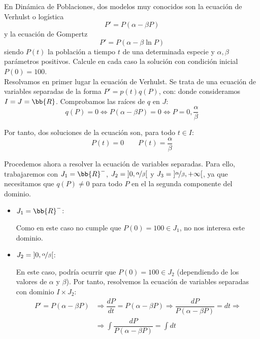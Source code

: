 \begin{ejercicio}
    En Dinámica de Poblaciones, dos modelos muy conocidos son la ecuación de Verhulst o logística
    \begin{equation*}
        P' = P(\alpha - \beta P)
    \end{equation*}
    y la ecuación de Gompertz
    \begin{equation*}
        P' = P(\alpha - \beta \ln P)
    \end{equation*}
    siendo $P(t)$ la población a tiempo $t$ de una determinada especie y $\alpha, \beta$ parámetros positivos. Calcule en cada caso la solución con condición inicial $P(0) = 100$.\\

    Resolvamos en primer lugar la ecuación de Verhulst. Se trata de una ecuación de variables separadas de la forma $P' = p(t)q(P)$, con:
    donde consideramos $I=J=\bb{R}$. Comprobamos las raíces de $q$ en $J$:
    \begin{equation*}
        q(P) = 0 \Longleftrightarrow P(\alpha - \beta P) = 0 \Longleftrightarrow P=0, \dfrac{\alpha}{\beta}
    \end{equation*}

    Por tanto, dos soluciones de la ecuación son, para todo $t\in I$:
    \begin{equation*}
        P(t) = 0 \qquad P(t) = \dfrac{\alpha}{\beta}
    \end{equation*}

    Procedemos ahora a resolver la ecuación de variables separadas. Para ello, trabajaremos con $J_1=\bb{R}^-$, $J_2=\left]0, \nicefrac{\alpha}{\beta}\right[$ y $J_3=\left]\nicefrac{\alpha}{\beta}, +\infty\right[$,
    ya que necesitamos que $q(P)\neq 0$ para todo $P$ en el la segunda componente del dominio.
    \begin{itemize}
        \item \ul{$J_1=\bb{R}^-$}:
        
        Como en este caso no cumple que $P(0)=100\in J_1$, no nos interesa este dominio.

        \item \ul{$J_2=\left]0, \nicefrac{\alpha}{\beta}\right[$}:
        
        En este caso, podría ocurrir que $P(0)=100\in J_2$ (dependiendo de los valores de $\alpha$ y $\beta$). Por tanto, resolvemos la ecuación de variables separadas con dominio $I\times J_2$:
        \begin{align*}
            P' = P(\alpha - \beta P) &\Longrightarrow \dfrac{dP}{dt} = P(\alpha - \beta P) \Longrightarrow \dfrac{dP}{P(\alpha - \beta P)} = dt \Longrightarrow \\ &\Longrightarrow \int \dfrac{dP}{P(\alpha - \beta P)} = \int dt
        \end{align*}


\end{itemize}
\end{ejercicio}
